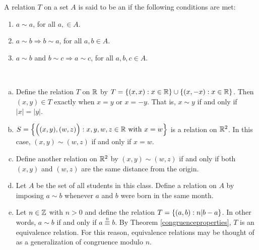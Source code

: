 \documentclass[11pt,fleqn,dvipsnames,usenames]{article}
\begin{document}
\begin{definition}
A relation $T$ on a set $A$ is said to be an  if the following conditions are met:
\begin{enumerate}[(1)]
\item $a\sim a$, for all $a,\in A$.
\item $a\sim b \Rightarrow b\sim a$, for all $a,b\in A$.
\item $a\sim b$ and $b\sim c \Rightarrow a\sim c$, for all $a,b,c\in A$.
\end{enumerate}
\end{definition}
%
\begin{examples}\label{equivalencerelationexamples}~
\begin{enumerate}[(a)]
\item Define the relation $T$ on $\mathbb{R}$ by $T = \left\{(x,x):x\in\mathbb{R}\right\}\cup \left\{(x,-x):x\in\mathbb{R}\right\}$.  Then $(x,y)\in T$ exactly when $x = y$ or $x = -y$.  That is, $x\sim y$ if and only if $|x| = |y|$.
\item $S = \left\{\Big((x,y), (w,z)\Big):x,y,w,z\in\mathbb{R}\text{ with }x = w\right\}$ is a relation on $\mathbb{R}^{2}$.  In this case, $(x,y)\sim (w,z)$ if and only if $x = w$.
\item Define another relation on $\mathbb{R}^{2}$ by $(x,y)\sim (w,z)$ if and only if both $(x,y)$ and $(w,z)$ are the same distance from the origin.
\item Let $A$ be the set of all students in this class.  Define a relation on $A$ by imposing $a\sim b$ whenever $a$ and $b$ were born in the same month.
\item Let $n\in \mathbb{Z}$ with $n > 0$ and define the relation $T = \left\{(a,b):n|b-a\right\}$.  In other words, $a\sim b$ if and only if $a\overset{n}{\equiv}b$.  By Theorem \ref{congruenceproperties}, $T$ is an equivalence relation.  For this reason, equivalence relations may be thought of as a generalization of congruence modulo $n$.
\end{enumerate}
\end{examples}
%
\end{document}
